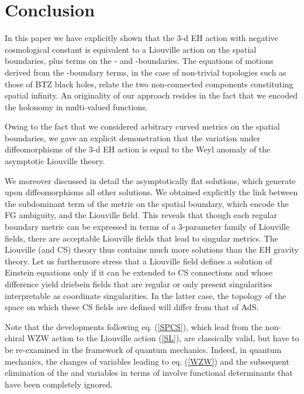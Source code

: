 \documentclass[a4paper,10pt]{article}
\begin{document}
\section{Conclusion}
In this paper we have explicitly shown that the 3-d EH action with
negative cosmological constant is equivalent to a Liouville action
on the spatial \coordHE{} boundaries, plus terms on the
\coordHE{}- and \myHighlight{$\varphi$}\coordHE{}-boundaries. The equations of motions derived
from the \myHighlight{$\varphi$}\coordHE{}-boundary terms, in the case of non-trivial topologies
such as those of BTZ black holes,
relate the two non-connected components constituting spatial infinity.
An originality of our approach resides
in the fact that we encoded the holonomy in multi-valued functions.

Owing to the fact that we considered arbitrary curved metrics on the spatial 
\coordHE{} boundaries,
we gave an explicit demonstration that the variation under
diffeomorphisms of the 3-d EH action is equal to the Weyl anomaly of the 
asymptotic Liouville theory.  

We moreover discussed in detail the asymptotically flat solutions, which
generate upon diffeomorphisms all other solutions. We obtained explicitly 
the link between the subdominant term of the metric on the spatial boundary,
which encode the FG ambiguity, and the Liouville field. This reveals that 
though each regular  boundary metric can be expressed in terms of 
a 3-parameter family of Liouville fields, there are
acceptable Liouville fields that lead to singular metrics.
The Liouville (and CS) theory thus contains much more solutions than the
EH gravity theory. 
Let us furthermore stress that a Liouville field defines a solution of
Einstein equations only if it can be extended to CS connections \coordHE{}
and \coordHE{} whose difference yield driebein fields that are regular
or only present singularities interpretable as coordinate singularities. 
In the latter case, 
the topology of the space on which these CS fields are defined 
will differ from that of AdS.

Note that the developments following eq. (\ref{SPCS}), which lead from
the non-chiral WZW action to the Liouville action (\ref{SL}), 
are classically 
valid, but have to be re-examined in the framework of quantum mechanics.
Indeed, in quantum mechanics, the changes of variables leading to 
eq. (\ref{WZW}) and the subsequent elimination of the \coordHE{} and \coordHE{} 
variables in terms of \myHighlight{$\Phi$}\coordHE{}
involve functional determinants that have been completely ignored.
\end{document}
